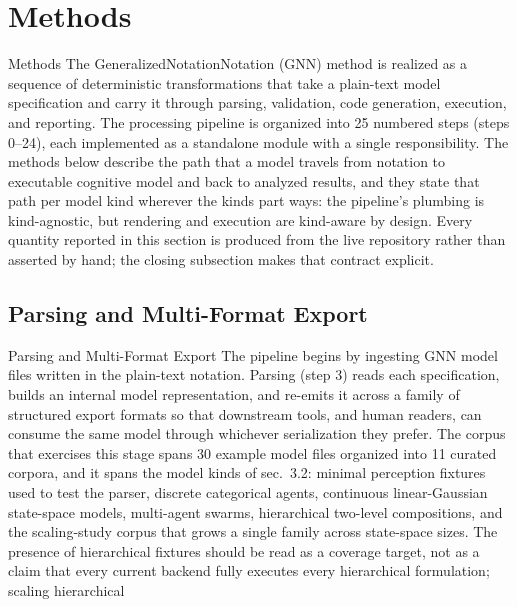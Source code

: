 \documentclass[
  ignorenonframetext,
]{beamer}
\author{\texorpdfstring{}{}}
\date{}
\begin{document}
\section{Methods}\label{sec:methods}

\begin{frame}[allowframebreaks]{Methods}
The GeneralizedNotationNotation (GNN) method is realized as a sequence
of deterministic transformations that take a plain-text model
specification and carry it through parsing, validation, code generation,
execution, and reporting. The processing pipeline is organized into 25
numbered steps (steps 0--24), each implemented as a standalone module
with a single responsibility. The methods below describe the path that a
model travels from notation to executable cognitive model and back to
analyzed results, and they state that path per model kind wherever the
kinds part ways: the pipeline's plumbing is kind-agnostic, but rendering
and execution are kind-aware by design. Every quantity reported in this
section is produced from the live repository rather than asserted by
hand; the closing subsection makes that contract explicit.
\end{frame}

\subsection{Parsing and Multi-Format
Export}\label{parsing-and-multi-format-export}

\begin{frame}[allowframebreaks]{Parsing and Multi-Format Export}
The pipeline begins by ingesting GNN model files written in the
plain-text notation. Parsing (step 3) reads each specification, builds
an internal model representation, and re-emits it across a family of
structured export formats so that downstream tools, and human readers,
can consume the same model through whichever serialization they prefer.
The corpus that exercises this stage spans 30 example model files
organized into 11 curated corpora, and it spans the model kinds of
sec.~3.2: minimal perception fixtures used to test the
parser, discrete categorical agents, continuous linear-Gaussian
state-space models, multi-agent swarms, hierarchical two-level
compositions, and the scaling-study corpus that grows a single family
across state-space sizes. The presence of hierarchical fixtures should
be read as a coverage target, not as a claim that every current backend
fully executes every hierarchical formulation; scaling hierarchical
\end{frame}
\end{document}
